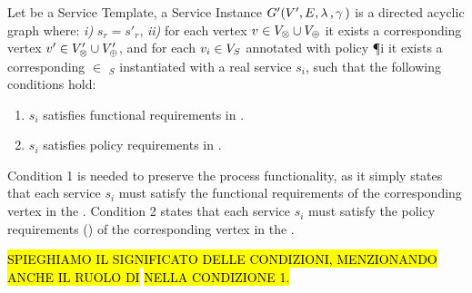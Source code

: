   \begin{definition}\label{def:instance}
    Let \tChartFunction be a Service Template, a Service Instance $G'(V',E,\lambda\,,\gamma\,)$ is a directed acyclic graph where:
    \emph{i)} $s_r=s'_r$, \emph{ii)} for each vertex $v_{}\in V_{\otimes}\cup V_{\oplus}$ it exists a corresponding vertex $v'_{}\in V'_{\otimes}\cup V'_{\oplus}$,
    and for each $v_{i}\in V_S$ annotated with policy \P{i} it exists a corresponding $\in$ \Vp$_S$ instantiated with a real service $s_i$, such that the following conditions hold:
    \begin{enumerate}[label=\arabic*)]
      \item $s_i$ satisfies functional requirements in \tChartFunction.
      \item $s_i$ satisfies policy requirements in \tChartFunction.

    \end{enumerate}
  \end{definition}

  Condition 1 is needed to preserve the process functionality, as it simply states that each service $s_i$ must satisfy the functional requirements of the corresponding vertex in the \pipelineTemplate.
  Condition 2 states that each service $s_i$ must satisfy the policy requirements \myLambda() of the corresponding vertex  in the \pipelineTemplate.



  \hl{SPIEGHIAMO IL SIGNIFICATO DELLE CONDIZIONI, MENZIONANDO ANCHE IL RUOLO DI}\F{}\hl{ NELLA CONDIZIONE 1.}

